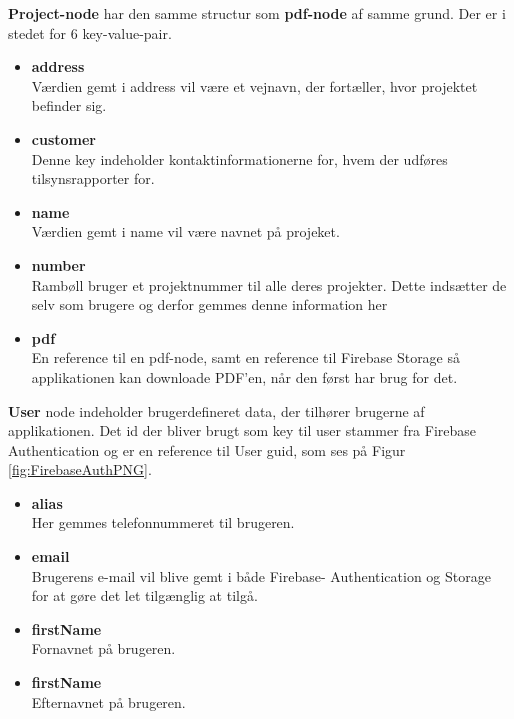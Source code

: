 	\textbf{Project-node} har den samme structur som \textbf{pdf-node} af samme grund. Der er i stedet for 6 key-value-pair. 
	\begin{itemize}
		\item  \textbf{address}\\
		Værdien gemt i address vil være et vejnavn, der fortæller, hvor projektet befinder sig.\\
		\item  \textbf{customer}\\
		Denne key indeholder kontaktinformationerne for, hvem der udføres tilsynsrapporter for.\\
		\item  \textbf{name}\\
		Værdien gemt i name vil være navnet på projeket.\\
		\item  \textbf{number}\\
		Rambøll bruger et projektnummer til alle deres projekter. Dette indsætter de selv som brugere og derfor gemmes denne information her\\
		\item  \textbf{pdf}\\
		En reference til en pdf-node, samt en reference til Firebase Storage så applikationen kan downloade PDF'en, når den først har brug for det.\\
	\end{itemize}

\textbf{User} node indeholder brugerdefineret data, der tilhører brugerne af applikationen. Det id der bliver brugt som key til user stammer fra Firebase Authentication og er en reference til User guid, som ses på Figur \ref{fig:FirebaseAuthPNG}. 
\begin{itemize}
	\item \textbf{alias} \\
	Her gemmes telefonnummeret til brugeren. \\
	\item \textbf{email} \\
	Brugerens e-mail vil blive gemt i både Firebase- Authentication og Storage for at gøre det let tilgænglig at tilgå.\\
	\item \textbf{firstName} \\
	Fornavnet på brugeren.\\
	\item \textbf{firstName} \\
	Efternavnet på brugeren.\\

\end{itemize}

\clearpage

